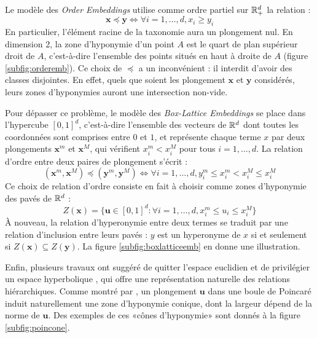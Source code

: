 Le modèle des \textit{Order Embeddings}\cite{vendrov2015order} utilise comme ordre partiel sur $\mathbb{R}^d_+$ la relation :
\begin{equation}
    \textbf{x} \preceq \textbf{y} \iff \forall i = 1, \ldots, d, {} x_i \geq y_i
\end{equation}
En particulier, l'élément racine de la taxonomie aura un plongement nul. %
En dimension 2, la zone d'hyponymie d'un point $A$ est le quart de plan supérieur droit de $A$, c'est-à-dire l'ensemble des points situés en haut à droite de $A$ (figure \ref{subfig:orderemb}). Ce choix de $\preceq$ a un inconvénient : il interdit d'avoir des classes disjointes. En effet, quels que soient les plongement $\textbf{x}$ et $\textbf{y}$ considérés, leurs zones d'hyponymies auront une intersection non-vide.

Pour dépasser ce problème, le modèle des \textit{Box-Lattice Embeddings} \cite{vilnis2018probabilistic} se place dans l'hypercube $[0, 1]^d$, c'est-à-dire l'ensemble des vecteurs de $\mathbb{R}^d$ dont toutes les coordonnées sont comprises entre $0$ et $1$, et représente chaque terme $x$ par deux plongements $\textbf{x}^m$ et $\textbf{x}^M$, qui vérifient $x_i^m < x_i^M$ pour tous $i = 1, \ldots, d$. La relation d'ordre entre deux paires de plongement s'écrit :
\begin{equation}
    (\textbf{x}^m, \textbf{x}^M) \preceq (\textbf{y}^m, \textbf{y}^M) \iff \forall i = 1, \ldots, d, {} y_i^m \leq x_i^m < x_i^M \leq x_i^M
\end{equation}
Ce choix de relation d'ordre consiste en fait à choisir comme zones d'hyponymie des pavés de $\mathbb{R}^d$ :
\begin{equation}
    Z(\textbf{x}) = \{ \textbf{u} \in [0, 1]^d : \forall i=1, \ldots, d, {} x_i^m \leq u_i \leq x_i^M \}
\end{equation}
À nouveau, la relation d'hyperonymie entre deux termes se traduit par une relation d'inclusion entre leurs pavés : $y$ est un hyperonyme de $x$ si et seulement si $Z(\textbf{x}) \subseteq Z(\textbf{y})$. La figure \ref{subfig:boxlatticeemb} en donne une illustration.

Enfin, plusieurs travaux ont suggéré de quitter l'espace euclidien et de privilégier un espace hyperbolique \cite{nickel2017poincare, nickel2018learning, Aly_2019, dhingra2018embedding, ganea2018hyperbolic}, qui offre une représentation naturelle des relations hiérarchiques. Comme montré par \cite{ganea2018hyperbolic}, un plongement $\textbf{u}$ dans une boule de Poincaré induit naturellement une zone d'hyponymie conique, dont la largeur dépend de la norme de $\textbf{u}$. Des exemples de ces «cônes d'hyponymie» sont donnés à la figure \ref{subfig:poincone}.


